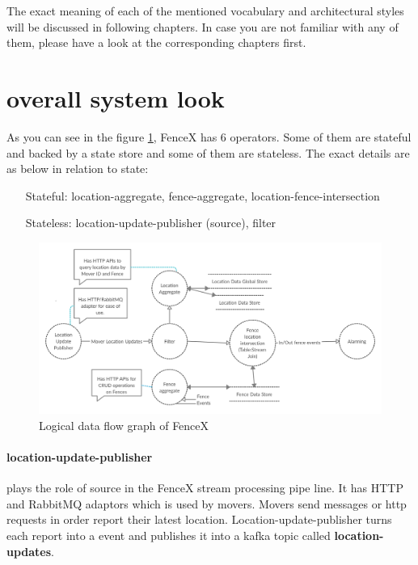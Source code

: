 \documentclass[a4]{report}
\begin{document}
    The exact meaning of each of the mentioned vocabulary and architectural styles will be discussed in following chapters. In case you are not familiar with any of them, please have a look at the corresponding chapters first.


    \section{overall system look}
    As you can see in the figure \ref{fig:logical-dfg}, FenceX has 6 operators. Some of them are stateful and backed by a state store and some of them are stateless.
    The exact details are as below in relation to state:

    \begin{itemize}
        \item[Stateful:] location-aggregate, fence-aggregate, location-fence-intersection
        \item[Stateless:] location-update-publisher (source), filter
    \end{itemize}

    \begin{figure}[ht]
        \caption{Logical data flow graph of FenceX}
        \label{fig:logical-dfg}
        \includegraphics[scale=0.2]{images/logical-data-flow-diagram.png}

    \end{figure}

    \paragraph{location-update-publisher} plays the role of source in the FenceX stream processing pipe line.
    It has HTTP and RabbitMQ adaptors which is used by movers.
    Movers send messages or http requests in order report their latest location.
    Location-update-publisher turns each report into a event and publishes it into a kafka topic called \textbf{location-updates}.
\end{document}
